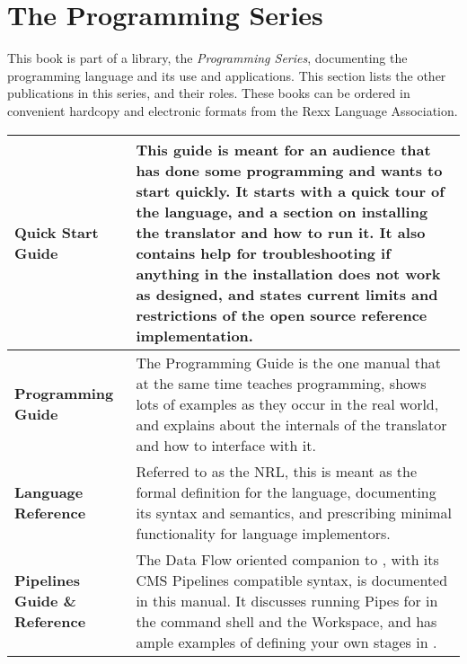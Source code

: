 \chapter{The \nr{} Programming Series}
This book is part of a library, the \emph{\nr{} Programming Series}, documenting the \nr{} programming language and its use and applications. This section lists the other publications in this series, and their roles. These books can be ordered in convenient hardcopy and electronic formats from the Rexx Language Association.
\newline
\newline
\begin{tabularx}{\textwidth}{>{\bfseries}lX}
\toprule
Quick Start Guide & This guide is meant for an audience that has done some programming and wants to start quickly. It starts with a quick tour of the language, and a section on installing the \nr{} translator and how to run it. It also contains help for troubleshooting if anything in the installation does not work as designed, and states current limits and restrictions of the open source reference implementation.
\\\midrule
Programming Guide & The Programming Guide is the one manual that at the same time teaches programming, shows lots of examples as they occur in the real world, and explains about the internals of the translator and how to interface with it.
\\\midrule
Language Reference & Referred to as the NRL, this is meant as the formal definition for the language, documenting its syntax and semantics, and prescribing minimal functionality for language implementors.
\\\midrule
Pipelines Guide \& Reference & The Data Flow oriented companion to \nr{}, with its CMS Pipelines compatible syntax, is documented in this manual. It discusses running Pipes for \nr{} in the command shell and the Workspace, and has ample examples of defining your own stages in \nr{}.
\\\bottomrule
\end{tabularx}
